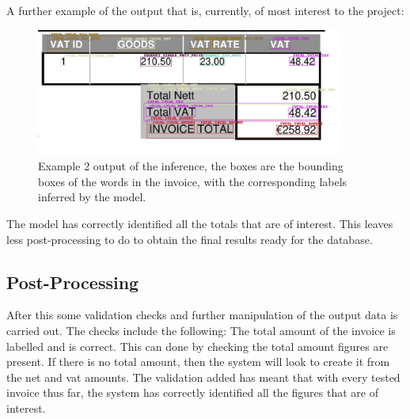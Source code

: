 A further example of the output that is, currently, of most interest to the project:
\begin{figure}[H]
	\centering
	\includegraphics[width=0.9\textwidth]{figures/infer_example_bottom.png}
	\caption{Example 2 output of the inference, the boxes are the bounding boxes of the words in the invoice, with the corresponding labels
		inferred by the model.}
	\label{fig:inference_output_bottom}
\end{figure}
The model has correctly identified all the totals that are of interest. This leaves less post-processing to do to obtain
the final results ready for the database. 

\subsection{Post-Processing}
After this some validation checks and further manipulation of the output data is carried out. The checks include the following:
The total amount of the invoice is labelled and is correct. This can done by checking the total amount figures are present. 
If there is no total amount, then the system will look to create it from the net and vat amounts.
The validation added has meant that with every tested invoice thus far, the system has correctly identified all the figures that
are of interest.
